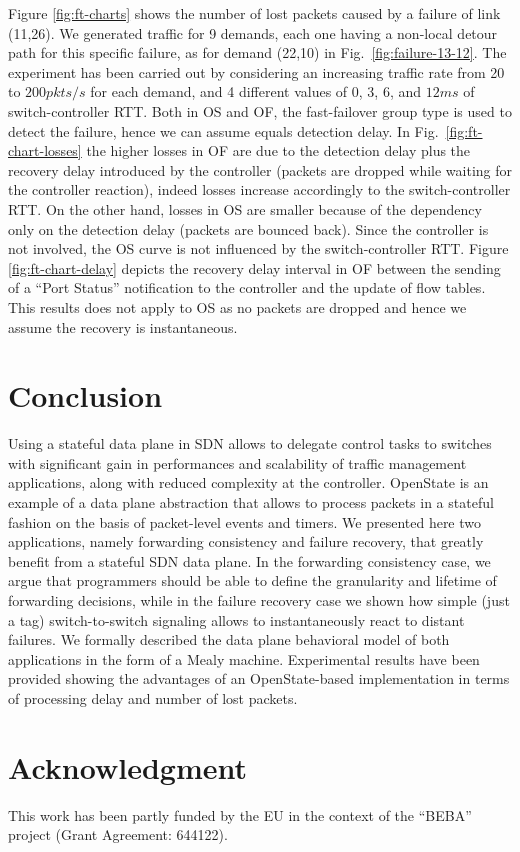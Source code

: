 \documentclass[10pt,conference]{IEEEtran}
\begin{document}
Figure \ref{fig:ft-charts} shows the number of lost packets caused by a failure of link (11,26). We generated traffic for 9 demands, each one having a non-local detour path for this specific failure, as for demand (22,10) in Fig.~\ref{fig:failure-13-12}. The experiment has been carried out by considering an increasing traffic rate from 20 to $200pkts/s$ for each demand, and 4 different values of 0, 3, 6, and $12ms$ of switch-controller RTT. Both in OS and OF, the fast-failover group type is used to detect the failure, hence we can assume equals detection delay. In Fig.~\ref{fig:ft-chart-losses} the higher losses in OF are due to the detection delay plus the recovery delay introduced by the controller (packets are dropped while waiting for the controller reaction), indeed losses increase accordingly to the switch-controller RTT. On the other hand, losses in OS are smaller because of the dependency only on the detection delay (packets are bounced back). Since the controller is not involved, the OS curve is not influenced by the switch-controller RTT. Figure \ref{fig:ft-chart-delay} depicts the recovery delay interval in OF between the sending of a ``Port Status'' notification to the controller and the update of flow tables. This results does not apply to OS as no packets are dropped and hence we assume the recovery is instantaneous.

\section{Conclusion}
\label{sec:conclusion}

Using a stateful data plane in SDN allows to delegate control tasks to switches with significant gain in performances and scalability of traffic management applications, along with reduced complexity at the controller. OpenState is an example of a data plane abstraction that allows to process packets in a stateful fashion on the basis of packet-level events and timers. We presented here two applications, namely forwarding consistency and failure recovery, that greatly benefit from a stateful SDN data plane. In the forwarding consistency case, we argue that programmers should be able to define the granularity and lifetime of forwarding decisions, while in the failure recovery case we shown how simple (just a tag) switch-to-switch signaling allows to instantaneously react to distant failures. We formally described the data plane behavioral model of both applications in the form of a Mealy machine. Experimental results have been provided showing the advantages of an OpenState-based implementation in terms of processing delay and number of lost packets.

\section*{Acknowledgment}
This work has been partly funded by the EU in the context of the ``BEBA'' project \cite{beba} (Grant Agreement: 644122).



\end{document}
